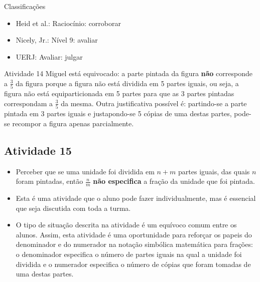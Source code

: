 \documentclass[oneside]{book}
\begin{document}
\begin{multicols}{2}
  Classificações
\begin{itemize} %
    \item       Heid et al.: Raciocínio: corroborar
    \item       Nicely, Jr.: Nível 9: avaliar
    \item       UERJ: Avaliar: julgar
\end{itemize} %



\begin{resposta*}{Atividade 14}
  Miguel está equivocado: a parte pintada da figura   {\bf não}   corresponde a   $\frac{3}{5}$   da figura porque a figura não está dividida em 5 partes iguais, ou seja, a figura não está equiparticionada em 5 partes para que as 3 partes pintadas correspondam a   $\frac{3}{5}$   da mesma. Outra justificativa possível é: partindo-se a parte pintada em 3 partes iguais e justapondo-se 5 cópias de uma destas partes, pode-se recompor a figura apenas parcialmente.

\end{resposta*}



\subsection{Atividade 15}



  \vspace{.1cm}

  \begin{itemize} %
    \item       Perceber que se uma unidade foi dividida em       $n + m$       partes iguais, das quais       $n$       foram pintadas, então       $\frac{n}{m}$             {\bf não especifica}       a fração da unidade que foi pintada.
\end{itemize} %


  \vspace{.1cm} 
  
  \vspace{.1cm}
  
\begin{itemize} %
    \item       Esta é uma atividade que o aluno pode fazer individualmente, mas é essencial que seja discutida com toda a turma.
    \item       O tipo de situação descrita na atividade é um equívoco comum entre os alunos. Assim, esta atividade é uma oportunidade para reforçar os papeis do denominador e do numerador na notação simbólica matemática para frações: o denominador especifica o número de partes iguais na qual a unidade foi dividida e o numerador especifica o número de cópias que foram tomadas de uma destas partes.
\end{itemize} %



\end{multicols}
\end{document}
